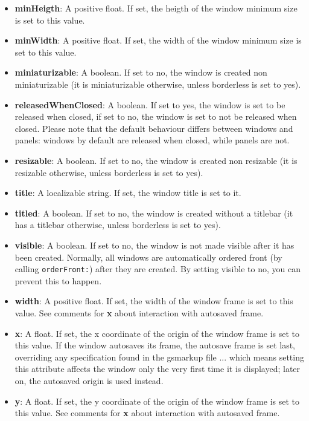 \begin{itemize}
\item {\bf minHeigth}: A positive float.  If set, the heigth
of the window minimum size is set to this value.
\item {\bf minWidth}: A positive float.  If set, the width  
of the window minimum size is set to this value.
\item {\bf miniaturizable}: A boolean.  If set to no, the window is created 
non miniaturizable (it is miniaturizable otherwise, unless borderless is
set to yes).
\item {\bf releasedWhenClosed}: A boolean.  If set to yes, the window is set to be 
released when closed, if set to no, the window is set to not be released
when closed.  Please note that the default behaviour differs between windows
and panels: windows by default are released when closed, while panels are not.
\item {\bf resizable}: A boolean.  If set to no, the window is created 
non resizable (it is resizable otherwise, unless borderless is set to yes).
\item {\bf title}: A localizable string.  If set, the window title is set to it.
\item {\bf titled}: A boolean.  If set to no, the window is created without
a titlebar (it has a titlebar otherwise, unless borderless is set to yes).
\item {\bf visible}: A boolean.  If set to no, the window is not made visible
after it has been created.  Normally, all windows are automatically
ordered front (by calling \texttt{orderFront:}) after they are
created.  By setting visible to no, you can prevent this to happen.
\item {\bf width}: A positive float.  If set, the width  
of the window frame is set to this value.  See comments for {\bf x} about
interaction with autosaved frame. 
\item {\bf x}: A float.  If set, the x coordinate of the origin 
of the window frame is set to this value.  If the window autosaves its
frame, the autosave frame is set last, overriding any specification
found in the gsmarkup file ... which means setting this attribute affects
the window only the very first time it is displayed; later on, the
autosaved origin is used instead.
\item {\bf y}: A float.  If set, the y coordinate of the origin of 
the window frame is set to this value.  See comments for {\bf x} about
interaction with autosaved frame.
\end{itemize}

